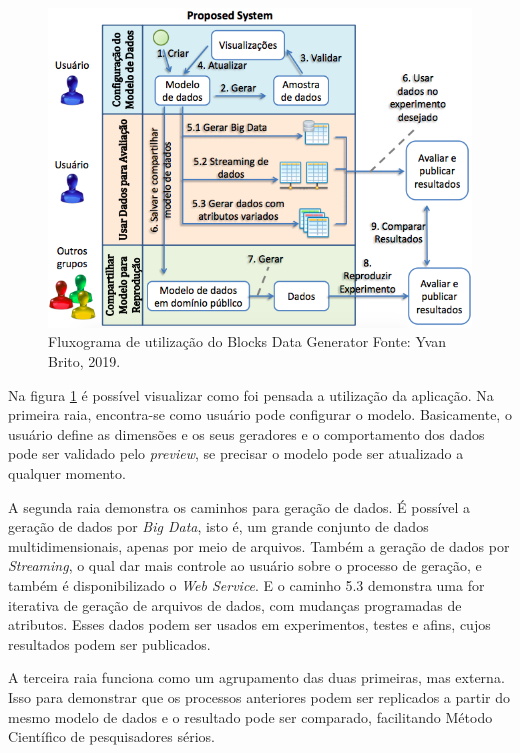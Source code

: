 \documentclass[
	12pt,				%
	openright,			%
	twoside,			%
	a4paper,			%
	english,			%
	brazil				%
	]{abntex2}
\begin{document}
	\begin{figure}[h]
		\centering
		\includegraphics[width=\linewidth]{./figures/prototipo/fluxogramaUtilizacaoBlocks.png}
		\caption{Fluxograma de utilização do Blocks Data Generator Fonte: Yvan Brito, 2019.}
		\label{fig:fluxograma}
	\end{figure}
	\par
	Na figura \ref{fig:fluxograma} é possível visualizar como foi pensada a utilização da aplicação.
	Na primeira raia, encontra-se como usuário pode configurar o modelo.
	Basicamente, o usuário define as dimensões e os seus geradores e o comportamento dos dados pode ser validado pelo \emph{preview}, se precisar o modelo pode ser atualizado a qualquer momento.
	\par
	A segunda raia demonstra os caminhos para geração de dados.
	É possível a geração de dados por \emph{Big Data}, isto é, um grande conjunto de dados multidimensionais, apenas por meio de arquivos.
	Também a geração de dados por \emph{Streaming}, o qual dar mais controle ao usuário sobre o processo de geração, e também é disponibilizado o \emph{Web Service}.
	E o caminho 5.3 demonstra uma for iterativa de geração de arquivos de dados, com mudanças programadas de atributos.
	Esses dados podem ser usados em experimentos, testes e afins, cujos resultados podem ser publicados.
	\par
	A terceira raia funciona como um agrupamento das duas primeiras, mas externa.
	Isso para demonstrar que os processos anteriores podem ser replicados a partir do mesmo modelo de dados e o resultado pode ser comparado, facilitando Método Científico de pesquisadores sérios.
\end{document}
